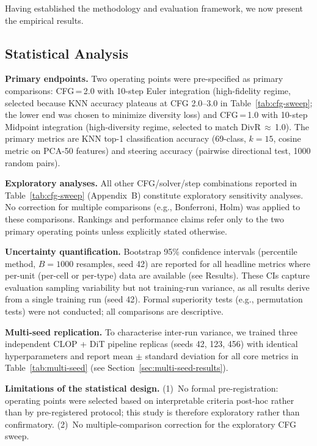 \documentclass[biology,article,submit,pdftex,moreauthors]{Definitions/mdpi}
\begin{document}
Having established the methodology and evaluation framework, we now present the empirical results.

\subsection{Statistical Analysis}\label{sec:stats}

\textbf{Primary endpoints.} Two operating points were pre-specified as primary comparisons: CFG\,=\,2.0 with 10-step Euler integration (high-fidelity regime, selected because KNN accuracy plateaus at CFG 2.0--3.0 in Table~\ref{tab:cfg-sweep}; the lower end was chosen to minimize diversity loss) and CFG\,=\,1.0 with 10-step Midpoint integration (high-diversity regime, selected to match DivR\,$\approx$\,1.0). The primary metrics are KNN top-1 classification accuracy (69-class, $k{=}15$, cosine metric on PCA-50 features) and steering accuracy (pairwise directional test, 1000 random pairs).

\textbf{Exploratory analyses.} All other CFG/solver/step combinations reported in Table~\ref{tab:cfg-sweep} (Appendix~B) constitute exploratory sensitivity analyses. No correction for multiple comparisons (e.g., Bonferroni, Holm) was applied to these comparisons. Rankings and performance claims refer only to the two primary operating points unless explicitly stated otherwise.

\textbf{Uncertainty quantification.} Bootstrap 95\% confidence intervals (percentile method, $B{=}1000$ resamples, seed 42) are reported for all headline metrics where per-unit (per-cell or per-type) data are available (see Results). These CIs capture evaluation sampling variability but not training-run variance, as all results derive from a single training run (seed 42). Formal superiority tests (e.g., permutation tests) were not conducted; all comparisons are descriptive.

\textbf{Multi-seed replication.} To characterise inter-run variance, we trained three independent CLOP + DiT pipeline replicas (seeds 42, 123, 456) with identical hyperparameters and report mean $\pm$ standard deviation for all core metrics in Table~\ref{tab:multi-seed} (see Section~\ref{sec:multi-seed-results}).

\textbf{Limitations of the statistical design.} (1)~No formal pre-registration: operating points were selected based on interpretable criteria post-hoc rather than by pre-registered protocol; this study is therefore exploratory rather than confirmatory. (2)~No multiple-comparison correction for the exploratory CFG sweep.
\end{document}
